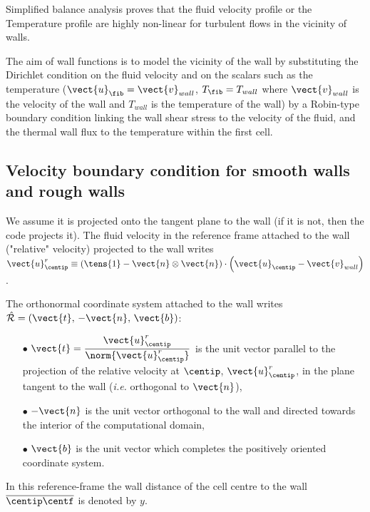 Simplified balance analysis proves that the fluid velocity profile or the Temperature profile are
highly non-linear  for turbulent flows in the vicinity of walls.

The aim of wall functions is to model the vicinity of the wall by substituting the Dirichlet condition on the fluid velocity and on the scalars such as the temperature ($\vect{u}_\fib = \vect{v}_{wall}$, $T_\fib = T_{wall}$ where $\vect{v}_{wall}$ is the velocity of the wall and $T_{wall}$ is the temperature of the wall) by a Robin-type boundary condition linking the wall shear stress to the velocity of the fluid, and the
thermal wall flux to the temperature within the first cell.

\subsection{Velocity boundary condition for smooth walls and rough walls}
We assume it is projected onto the tangent plane to the wall (if it is not, then the code projects it).
The fluid velocity in the reference frame attached to the wall ("relative" velocity) projected to the wall writes
$\vect{u}^r _\centip \equiv \left(\tens{1} - \vect{n} \otimes \vect{n} \right)\cdot \left( \vect{u}_\centip - \vect{v}_{wall} \right)$.

The orthonormal coordinate system attached to the wall writes
$\hat {\mathcal R}=(\vect{t}, \, -\vect{n}, \, \vect{b})$:
%
\begin{itemize}
\item [$\bullet$] $\vect{t} = \displaystyle\frac{ \vect{u}^r_{\centip} }{ \norm{ \vect{u}^r_{\centip} }}$ is the unit vector parallel to the projection of the relative velocity at $\centip$, $\vect{u}^r_{\centip}$, in the plane tangent to the wall
 (\emph{i.e.} orthogonal to $\vect{n}$),
\item [$\bullet$] $-\vect{n}$ is the unit vector orthogonal to the wall and directed towards the interior of the computational domain,
\item[$\bullet$] $\vect{b}$ is the unit vector which completes the positively oriented coordinate system.
\end{itemize}
In this reference-frame the wall distance of the cell centre to the wall $\overline{\centip \centf}$ is denoted by $y$.

